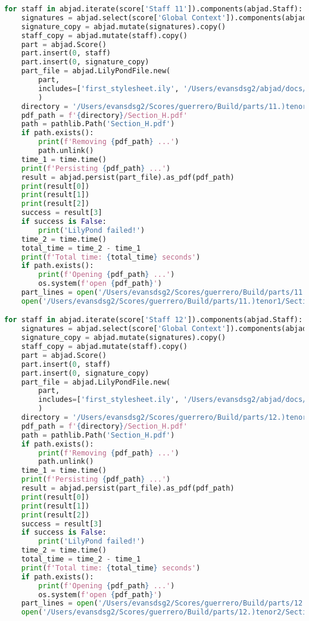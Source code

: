 \begin{lstlisting}[language=Python, caption=Invocation Source Code]
for staff in abjad.iterate(score['Staff 11']).components(abjad.Staff):
    signatures = abjad.select(score['Global Context']).components(abjad.Staff)
    signature_copy = abjad.mutate(signatures).copy()
    staff_copy = abjad.mutate(staff).copy()
    part = abjad.Score()
    part.insert(0, staff)
    part.insert(0, signature_copy)
    part_file = abjad.LilyPondFile.new(
        part,
        includes=['first_stylesheet.ily', '/Users/evansdsg2/abjad/docs/source/_stylesheets/abjad.ily'],
        )
    directory = '/Users/evansdsg2/Scores/guerrero/Build/parts/11.)tenor1'
    pdf_path = f'{directory}/Section_H.pdf'
    path = pathlib.Path('Section_H.pdf')
    if path.exists():
        print(f'Removing {pdf_path} ...')
        path.unlink()
    time_1 = time.time()
    print(f'Persisting {pdf_path} ...')
    result = abjad.persist(part_file).as_pdf(pdf_path)
    print(result[0])
    print(result[1])
    print(result[2])
    success = result[3]
    if success is False:
        print('LilyPond failed!')
    time_2 = time.time()
    total_time = time_2 - time_1
    print(f'Total time: {total_time} seconds')
    if path.exists():
        print(f'Opening {pdf_path} ...')
        os.system(f'open {pdf_path}')
    part_lines = open('/Users/evansdsg2/Scores/guerrero/Build/parts/11.)tenor1/Section_H.ly').readlines()
    open('/Users/evansdsg2/Scores/guerrero/Build/parts/11.)tenor1/Section_H.ly', 'w').writelines(part_lines[15:-1])

for staff in abjad.iterate(score['Staff 12']).components(abjad.Staff):
    signatures = abjad.select(score['Global Context']).components(abjad.Staff)
    signature_copy = abjad.mutate(signatures).copy()
    staff_copy = abjad.mutate(staff).copy()
    part = abjad.Score()
    part.insert(0, staff)
    part.insert(0, signature_copy)
    part_file = abjad.LilyPondFile.new(
        part,
        includes=['first_stylesheet.ily', '/Users/evansdsg2/abjad/docs/source/_stylesheets/abjad.ily'],
        )
    directory = '/Users/evansdsg2/Scores/guerrero/Build/parts/12.)tenor2'
    pdf_path = f'{directory}/Section_H.pdf'
    path = pathlib.Path('Section_H.pdf')
    if path.exists():
        print(f'Removing {pdf_path} ...')
        path.unlink()
    time_1 = time.time()
    print(f'Persisting {pdf_path} ...')
    result = abjad.persist(part_file).as_pdf(pdf_path)
    print(result[0])
    print(result[1])
    print(result[2])
    success = result[3]
    if success is False:
        print('LilyPond failed!')
    time_2 = time.time()
    total_time = time_2 - time_1
    print(f'Total time: {total_time} seconds')
    if path.exists():
        print(f'Opening {pdf_path} ...')
        os.system(f'open {pdf_path}')
    part_lines = open('/Users/evansdsg2/Scores/guerrero/Build/parts/12.)tenor2/Section_H.ly').readlines()
    open('/Users/evansdsg2/Scores/guerrero/Build/parts/12.)tenor2/Section_H.ly', 'w').writelines(part_lines[15:-1])


\end{lstlisting}
